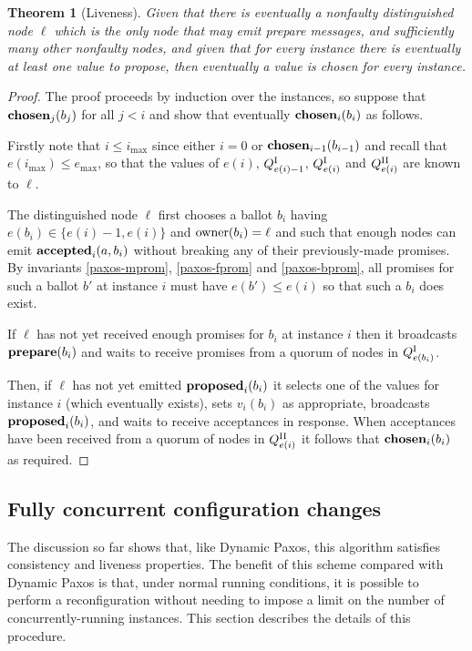 \documentclass[journal]{IEEEtran}
\newtheorem{theorem}{Theorem}
\begin{document}
\begin{theorem}[Liveness]\label{liveness-theorem} Given that there is
  eventually a nonfaulty distinguished node $\ell$ which is the only node that
  may emit prepare messages, and sufficiently many other nonfaulty nodes, and
  given that for every instance there is eventually at least one value to
propose, then eventually a value is chosen for every instance.  \end{theorem}

\begin{proof} The proof proceeds by induction over the instances, so suppose
that $\mathbf{chosen}_{j}(b_j)$ for all $j < i$ and show that eventually
$\mathbf{chosen}_{i}(b_i)$ as follows.

Firstly note that $i \le i_{\mathrm{max}}$ since either $i = 0$ or
$\mathbf{chosen}_{i-1}(b_{i-1})$ and recall that $e(i_{\mathrm{max}}) \le
e_{\mathrm{max}}$, so that the values of $e(i)$, ${Q}^\textrm{I}_{e(i)-1}$, ${Q}^\textrm{I}_{e(i)}$ and
${Q}^\textrm{II}_{e(i)}$ are known to $\ell$.

The distinguished node $\ell$ first chooses a ballot $b_i$ having $e(b_i) \in
\{ e(i) - 1, e(i) \}$ and $\mathrm{owner}(b_i) = \ell$ and such that enough nodes can
emit $\mathbf{accepted}_{i}(a,b_i)$ without breaking any of their previously-made promises.
By invariants \ref{paxos-mprom}, \ref{paxos-fprom} and \ref{paxos-bprom}, all
promises for such a ballot $b'$ at instance $i$ must have $e(b') \le e(i)$ so
that such a $b_i$ does exist.

If $\ell$ has not yet received enough promises for $b_i$ at instance $i$ then
it broadcasts $\mathbf{prepare}(b_i)$ and waits to receive promises from a quorum of nodes
in ${Q}^\textrm{I}_{e(b_i)}$.

Then, if $\ell$ has not yet emitted $\mathbf{proposed}_{i}(b_i)$ it selects one of the
values for instance $i$ (which eventually exists), sets $v_i(b_i)$ as
appropriate, broadcasts $\mathbf{proposed}_{i}(b_i)$, and waits to receive acceptances in
response. When acceptances have been received from a quorum of nodes in
${Q}^\textrm{II}_{e(i)}$ it follows that $\mathbf{chosen}_{i}(b_i)$ as required. \end{proof}

\subsection{Fully concurrent configuration changes}\label{fully-concurrent}

The discussion so far shows that, like Dynamic Paxos, this algorithm satisfies
consistency and liveness properties.  The benefit of this scheme compared with
Dynamic Paxos is that, under normal running conditions, it is possible to
perform a reconfiguration without needing to impose a limit on the number of
concurrently-running instances. This section describes the details of this
procedure.
\end{document}
